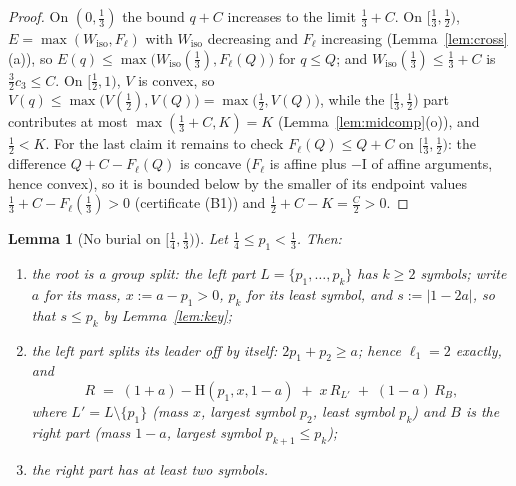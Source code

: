 \documentclass[journal]{IEEEtran}
\newtheorem{lemma}{Lemma}
\theoremstyle{definition}
\newcommand{\CC}{C}
\newcommand{\cthree}{c_3}
\begin{document}
\begin{proof}
On $(0,\tfrac13)$ the bound $q+\CC$ increases to the limit
$\tfrac13+\CC$. On $[\tfrac13,\tfrac12)$, $E=\max(W_{\mathrm{iso}},F_\ell)$
with $W_{\mathrm{iso}}$ decreasing and $F_\ell$ increasing
(Lemma~\ref{lem:cross}(a)), so
$E(q)\le\max\bigl(W_{\mathrm{iso}}(\tfrac13),F_\ell(Q)\bigr)$ for
$q\le Q$; and $W_{\mathrm{iso}}(\tfrac13)\le\tfrac13+\CC$ is
$\tfrac32\cthree\le\CC$. On $[\tfrac12,1)$,
$V$ is convex, so
$V(q)\le\max\bigl(V(\tfrac12),V(Q)\bigr)=\max\bigl(\tfrac12,V(Q)\bigr)$,
while the $[\tfrac13,\tfrac12)$ part contributes at most
$\max(\tfrac13+\CC,K)=K$ \textup{(}Lemma~\ref{lem:midcomp}(o)\textup{)},
and $\tfrac12<K$. For the last claim it remains to check
$F_\ell(Q)\le Q+\CC$ on $[\tfrac13,\tfrac12)$: the difference
$Q+\CC-F_\ell(Q)$ is concave \textup{(}$F_\ell$ is affine plus $-\mathrm I$ of
affine arguments, hence convex\textup{)}, so it is bounded below by the
smaller of its endpoint values $\tfrac13+\CC-F_\ell(\tfrac13)>0$
\textup{(}certificate \textup{(B1)}\textup{)} and
$\tfrac12+\CC-K=\tfrac{\CC}2>0$.
\end{proof}

\begin{lemma}[No burial on $[\tfrac14,\tfrac13)$]\label{lem:noburial-q}
Let $\tfrac14\le p_1<\tfrac13$. Then:
\begin{enumerate}
\item[\textup{(i)}] the root is a group split: the left part
$L=\{p_1,\dots,p_k\}$ has $k\ge2$ symbols; write $a$ for its mass,
$x:=a-p_1>0$, $p_k$ for its least symbol, and $s:=|1-2a|$, so that
$s\le p_k$ by Lemma~\ref{lem:key};
\item[\textup{(ii)}] the left part splits its leader off by itself: $2p_1+p_2\ge a$;
hence $\ell_1=2$ exactly, and
\begin{equation}\label{eq:master-q}
  R\;=\;(1+a)-\mathrm H(p_1,x,1-a)\;+\;x\,R_{L'}\;+\;(1-a)\,R_{B},
\end{equation}
where $L'=L\setminus\{p_1\}$ \textup{(}mass $x$, largest symbol $p_2$, least
symbol $p_k$\textup{)} and $B$ is the right part \textup{(}mass $1-a$,
largest symbol $p_{k+1}\le p_k$\textup{)};
\item[\textup{(iii)}] the right part has at least two symbols.
\end{enumerate}
\end{lemma}
\end{document}
